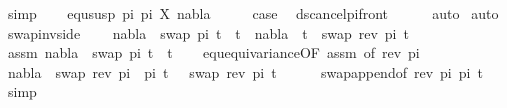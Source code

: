 \begin{isabellebody}
\ simp\isanewline
{}\isamarkupfalse%
\isanewline
\ \ \isamarkupfalse%
\ {\isacharparenleft}{\kern0pt}equ{\isacharunderscore}{\kern0pt}susp\ pi{}\ pi{}\ X\ nabla{\isacharparenright}{\kern0pt}\isanewline
\ \ \isamarkupfalse%
\ \isamarkupfalse%
\ {\isacharquery}{\kern0pt}case\ \isamarkupfalse%
\ ds{\isacharunderscore}{\kern0pt}cancel{\isacharunderscore}{\kern0pt}pi{\isacharunderscore}{\kern0pt}front\isanewline
\ \ \ \ \isamarkupfalse%
\ auto\isanewline
{}\isamarkupfalse%
\ {\isacharparenleft}{\kern0pt}auto{\isacharparenright}{\kern0pt}%
\endisatagproof
{\isafoldproof}%
%
\isadelimproof
\isanewline
%
\endisadelimproof
\isanewline
{}\isamarkupfalse%
\ swap{\isacharunderscore}{\kern0pt}inv{\isacharunderscore}{\kern0pt}side{\isacharcolon}{\kern0pt}\ \isanewline
\ \ \ {\isachardoublequoteopen}nabla\ {\isasymturnstile}\ swap\ pi\ t{}\ {\isasymapprox}\ t{}\ {\isacharequal}{\kern0pt}\ nabla\ {\isasymturnstile}\ t{}\ {\isasymapprox}\ swap\ {\isacharparenleft}{\kern0pt}rev\ pi{\isacharparenright}{\kern0pt}\ t{}{\isachardoublequoteclose}\isanewline
%
\isadelimproof
%
\endisadelimproof
%
\isatagproof
{}\isamarkupfalse%
\isanewline
\ \ \isanewline
\ \ \isacommand{{\isacharbraceleft}{\kern0pt}}\isamarkupfalse%
\isamarkupfalse%
\ assm{}{\isacharcolon}{\kern0pt}\ {\isachardoublequoteopen}nabla\ {\isasymturnstile}\ swap\ pi\ t{}\ {\isasymapprox}\ t{}{\isachardoublequoteclose}\isanewline
\ \ \isamarkupfalse%
\ equ{\isacharunderscore}{\kern0pt}equivariance{\isacharbrackleft}{\kern0pt}OF\ assm{}{\isacharcomma}{\kern0pt}\ of\ {\isacartoucheopen}rev\ pi{\isacartoucheclose}{\isacharbrackright}{\kern0pt}\isanewline
\ \ \isamarkupfalse%
\ {\isachardoublequoteopen}nabla\ {\isasymturnstile}\ swap\ {\isacharparenleft}{\kern0pt}rev\ pi\ {\isacharat}{\kern0pt}\ pi{\isacharparenright}{\kern0pt}\ t{}\ \ {\isasymapprox}\ swap\ {\isacharparenleft}{\kern0pt}rev\ pi{\isacharparenright}{\kern0pt}\ t{}{\isachardoublequoteclose}\isanewline
\ \ \ \ \isamarkupfalse%
\ swap{\isacharunderscore}{\kern0pt}append{\isacharbrackleft}{\kern0pt}of\ {\isacartoucheopen}rev\ pi{\isacartoucheclose}\ pi\ t{}{\isacharbrackright}{\kern0pt}\ \isamarkupfalse%
\ simp\isanewline
\ \ \isamarkupfalse%
\ \isamarkupfalse%

\end{isabellebody}
